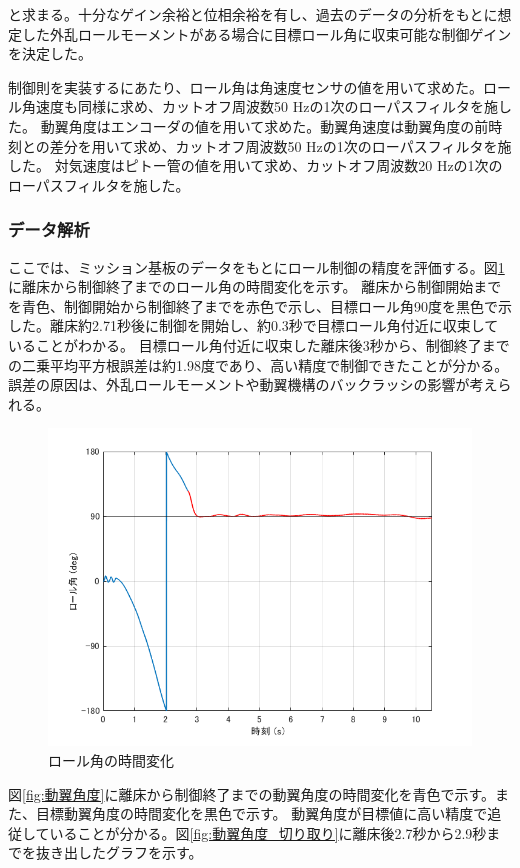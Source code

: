 \documentclass[a4paper,11pt,titlepage,uplatex]{jsarticle}
\begin{document}
と求まる。十分なゲイン余裕と位相余裕を有し、過去のデータの分析をもとに想定した外乱ロールモーメントがある場合に目標ロール角に収束可能な制御ゲインを決定した。\par
制御則を実装するにあたり、ロール角は角速度センサの値を用いて求めた。ロール角速度も同様に求め、カットオフ周波数50 Hzの1次のローパスフィルタを施した。
動翼角度はエンコーダの値を用いて求めた。動翼角速度は動翼角度の前時刻との差分を用いて求め、カットオフ周波数50 Hzの1次のローパスフィルタを施した。
対気速度はピトー管の値を用いて求め、カットオフ周波数20 Hzの1次のローパスフィルタを施した。
\subsubsection{データ解析}
\label{sc:data_doyoku}
ここでは、ミッション基板のデータをもとにロール制御の精度を評価する。図\ref{fig:ロール角}に離床から制御終了までのロール角の時間変化を示す。
離床から制御開始までを青色、制御開始から制御終了までを赤色で示し、目標ロール角90度を黒色で示した。離床約2.71秒後に制御を開始し、約0.3秒で目標ロール角付近に収束していることがわかる。
目標ロール角付近に収束した離床後3秒から、制御終了までの二乗平均平方根誤差は約1.98度であり、高い精度で制御できたことが分かる。誤差の原因は、外乱ロールモーメントや動翼機構のバックラッシの影響が考えられる。\par
\begin{figure}[H]
	\centering
	\includegraphics[width=0.8\linewidth]{pic_avi/ロール角.png}
	\caption{ロール角の時間変化}
	\label{fig:ロール角}
\end{figure}
図\ref{fig:動翼角度}に離床から制御終了までの動翼角度の時間変化を青色で示す。また、目標動翼角度の時間変化を黒色で示す。
動翼角度が目標値に高い精度で追従していることが分かる。図\ref{fig:動翼角度_切り取り}に離床後2.7秒から2.9秒までを抜き出したグラフを示す。
\end{document}
